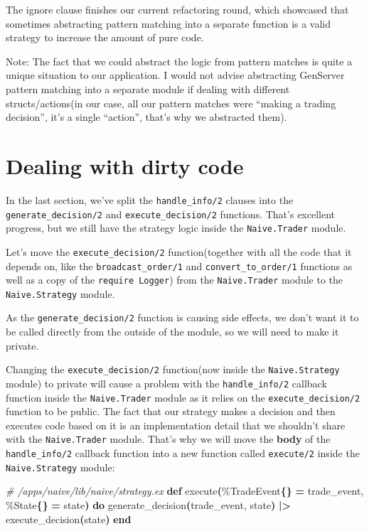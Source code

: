 \documentclass[
  oneside]{book}
\newenvironment{Shaded}{\begin{snugshade}}{\end{snugshade}}
\newcommand{\CommentTok}[1]{\textcolor[rgb]{0.56,0.35,0.01}{\textit{#1}}}
\newcommand{\ConstantTok}[1]{\textcolor[rgb]{0.56,0.35,0.01}{#1}}
\newcommand{\FunctionTok}[1]{\textcolor[rgb]{0.13,0.29,0.53}{\textbf{#1}}}
\newcommand{\KeywordTok}[1]{\textcolor[rgb]{0.13,0.29,0.53}{\textbf{#1}}}
\newcommand{\NormalTok}[1]{#1}
\newcommand{\OperatorTok}[1]{\textcolor[rgb]{0.81,0.36,0.00}{\textbf{#1}}}
\begin{document}
The ignore clause finishes our current refactoring round, which showcased that sometimes abstracting pattern matching into a separate function is a valid strategy to increase the amount of pure code.

Note: The fact that we could abstract the logic from pattern matches is quite a unique situation to our application. I would not advise abstracting GenServer pattern matching into a separate module if dealing with different structs/actions(in our case, all our pattern matches were ``making a trading decision'', it's a single ``action'', that's why we abstracted them).

\section{Dealing with dirty code}\label{dealing-with-dirty-code}

In the last section, we've split the \texttt{handle\_info/2} clauses into the \texttt{generate\_decision/2} and \texttt{execute\_decision/2} functions. That's excellent progress, but we still have the strategy logic inside the \texttt{Naive.Trader} module.

Let's move the \texttt{execute\_decision/2} function(together with all the code that it depends on, like the \texttt{broadcast\_order/1} and \texttt{convert\_to\_order/1} functions as well as a copy of the \texttt{require\ Logger}) from the \texttt{Naive.Trader} module to the \texttt{Naive.Strategy} module.

As the \texttt{generate\_decision/2} function is causing side effects, we don't want it to be called directly from the outside of the module, so we will need to make it private.

Changing the \texttt{execute\_decision/2} function(now inside the \texttt{Naive.Strategy} module) to private will cause a problem with the \texttt{handle\_info/2} callback function inside the \texttt{Naive.Trader} module as it relies on the \texttt{execute\_decision/2} function to be public. The fact that our strategy makes a decision and then executes code based on it is an implementation detail that we shouldn't share with the \texttt{Naive.Trader} module. That's why we will move the \textbf{body} of the \texttt{handle\_info/2} callback function into a new function called \texttt{execute/2} inside the \texttt{Naive.Strategy} module:

\begin{Shaded}
\begin{Highlighting}[]
\CommentTok{\# /apps/naive/lib/naive/strategy.ex}
  \KeywordTok{def}\NormalTok{ execute}\FunctionTok{(}\NormalTok{\%}\ConstantTok{TradeEvent}\FunctionTok{\{\}} \OperatorTok{=}\NormalTok{ trade\_event, \%}\ConstantTok{State}\FunctionTok{\{\}} \OperatorTok{=}\NormalTok{ state}\FunctionTok{)} \KeywordTok{do}
\NormalTok{    generate\_decision}\FunctionTok{(}\NormalTok{trade\_event, state}\FunctionTok{)}
    \OperatorTok{|\textgreater{}}\NormalTok{ execute\_decision}\FunctionTok{(}\NormalTok{state}\FunctionTok{)}
  \KeywordTok{end}
\end{Highlighting}
\end{Shaded}
\end{document}
